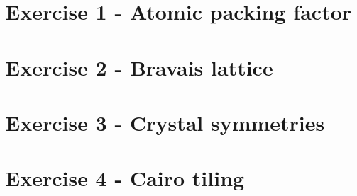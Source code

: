 








\section{Exercise 1 - Atomic packing factor}


\section{Exercise 2 - Bravais lattice}


\section{Exercise 3 - Crystal symmetries}
%

\section{Exercise 4 - Cairo tiling}



